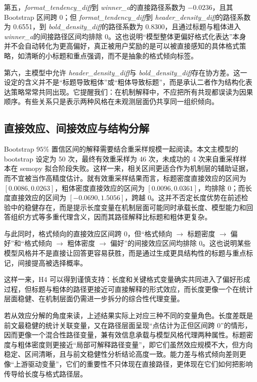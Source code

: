 \documentclass[9pt,a4paper,fontset=windows]{ctexart}
\theoremstyle{definition}
\numberwithin{equation}{section}
\newcommand{\winner}{\textit{winner\_a}}
\newcommand{\headerD}{\textit{header\_density\_diff}}
\newcommand{\boldD}{\textit{bold\_density\_diff}}
\newcommand{\formatt}{\textit{format\_tendency\_diff}}
\begin{document}
第五，\formatt 到 \winner 的直接路径系数为 \(-0.0236\)，且其 Bootstrap 区间跨 0；但 \formatt 到 \headerD 的路径系数为 0.6551，到 \boldD 的路径系数为 0.8300，且通过标题与粗体进入 \winner 的间接路径区间均排除 0。这也说明“模型整体更偏好格式化表达”本身并不会自动转化为更高偏好，真正被用户奖励的是可以被直接感知的具体格式策略，如清晰的小标题和重点强调，而不是抽象的格式倾向标签。

第六，主模型中允许 \headerD 与 \boldD 存在协方差。这一设定的含义并不是“标题导致粗体”或“粗体导致标题”，而是承认二者作为结构化表达策略常常共同出现。它提醒我们：在机制解释中，不应把所有共现都误读为因果顺序。有些关系只是表示两种风格在未观测层面仍共享同一组织倾向。

\subsection{直接效应、间接效应与结构分解}
Bootstrap \(95\%\) 置信区间的解释需要结合重采样规模一起阅读。本文主模型的 bootstrap 设定为 50 次，最终有效重采样为 46 次，未成功的 4 次来自重采样样本在 semopy 拟合阶段失败。这样一来，相关区间更适合作为机制层的辅助证据，而不宜被当作高精度估计。就有效重采样结果而言，标题密度直接效应的区间为 \([0.0086,0.0263]\)，粗体密度直接效应的区间为 \([0.0096,0.0361]\)，均排除 0；而长度直接效应的区间为 \([-0.0690,1.5056]\)，跨越 0。这并不否定长度优势在前述检验中的稳健存在，而是提示长度变量在机制层面可能同时承载长度、模型能力和回答组织方式等多重代理含义，因而其路径解释比标题和粗体更复杂。

与此同时，格式倾向的直接效应区间跨 0，但“格式倾向 \(\rightarrow\) 标题密度 \(\rightarrow\) 偏好”和“格式倾向 \(\rightarrow\) 粗体密度 \(\rightarrow\) 偏好”的间接效应区间均排除 0。这也说明某些模型风格并不是直接让回答更容易获胜，而是通过生成更具结构性的标题与重点标记，间接提高被选择概率。

这样一来，H4 可以得到谨慎支持：长度和关键格式变量确实共同进入了偏好形成过程，但标题与粗体的路径更接近可直接解释的形式效应，而长度更像一个在统计层面稳健、在机制层面仍需进一步拆分的综合性代理变量。

若从效应分解的角度来读，上述结果实际上对应三种不同的变量角色。长度差既是前文最稳健的统计关联变量，又在路径层面呈现“点估计为正但区间跨 0”的情形，因而更像一个混合性路径变量，兼有效信息承载与模型风格代理两种属性。标题密度与粗体密度则更接近“局部可解释路径变量”，即它们虽然效应规模不大，但方向稳定、区间清晰，且与前文稳健性分析结论高度一致。能力差与格式倾向差则更像“上游驱动变量”，它们的重要性不只体现在直接路径，更体现在它们如何把影响传导给长度与格式路径层。
\end{document}
